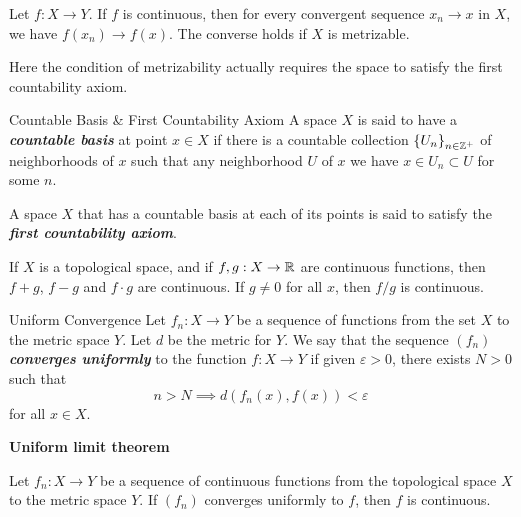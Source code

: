 \documentclass[12pt,a4paper]{article}
\begin{document}
    \begin{thm}
        Let $f:X\to Y$. If $f$ is continuous, then for every convergent sequence $x_n\to x$ in $X$, we have $f(x_n)\to f(x)$. The converse holds if $X$ is metrizable.
    \end{thm}
    \begin{remark}
        Here the condition of metrizability actually requires the space to satisfy the first countability axiom.
    \end{remark}
    \hfill

    \begin{defi}{Countable Basis \& First Countability Axiom}
        A space $X$ is said to have a \textbf{\textit{countable basis}} at point $x\in X$ if there is a countable collection $\left\{U_n\right\}_{n\in\mathbb{Z}^+}$ of neighborhoods of $x$ such that any neighborhood $U$ of $x$ we have $x\in U_n\subset U$ for some $n$. 

        A space $X$ that has a countable basis at each of its points is said to satisfy the \textbf{\textit{first countability axiom}}.
    \end{defi}

    \begin{thm}
        If $X$ is a topological space, and if $f,g:X\to\mathbb{R}$ are continuous functions, then $f+g$, $f-g$ and $f\cdot g$ are continuous. If $g\neq0$ for all $x$, then $f/g$ is continuous. 
    \end{thm}
    \hfill

    \begin{defi}{Uniform Convergence}
        Let $f_n:X\to Y$ be a sequence of functions from the set $X$ to the metric space $Y$. Let $d$ be the metric for $Y$. We say that the sequence $(f_n)$ \textbf{\textit{converges uniformly}} to the function $f:X\to Y$ if given $\varepsilon>0$, there exists $N>0$ such that
        $$
        n>N\implies d(f_n(x),f(x))<\varepsilon 
        $$
        for all $x\in X$.
    \end{defi}
    \hfill

    \begin{thm}\textbf{Uniform limit theorem}\hfill

        Let $f_n:X\to Y$ be a sequence of continuous functions from the topological space $X$ to the metric space $Y$. If $(f_n)$ converges uniformly to $f$, then $f$ is continuous.        
    \end{thm}
    \hfill
\end{document}
